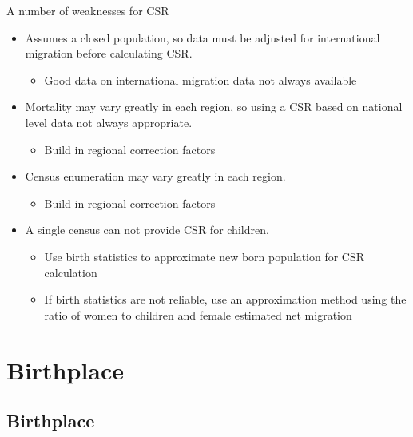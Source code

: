 \documentclass[
]{book}
\providecommand{\tightlist}{%
  \setlength{\itemsep}{0pt}\setlength{\parskip}{0pt}}
\begin{document}
A number of weaknesses for CSR

\begin{itemize}
\tightlist
\item
  Assumes a closed population, so data must be adjusted for international migration before calculating CSR.

  \begin{itemize}
  \tightlist
  \item
    Good data on international migration data not always available
  \end{itemize}
\item
  Mortality may vary greatly in each region, so using a CSR based on national level data not always appropriate.

  \begin{itemize}
  \tightlist
  \item
    Build in regional correction factors
  \end{itemize}
\item
  Census enumeration may vary greatly in each region.

  \begin{itemize}
  \tightlist
  \item
    Build in regional correction factors
  \end{itemize}
\item
  A single census can not provide CSR for children.

  \begin{itemize}
  \tightlist
  \item
    Use birth statistics to approximate new born population for CSR calculation
  \item
    If birth statistics are not reliable, use an approximation method using the ratio of women to children and female estimated net migration
  \end{itemize}
\end{itemize}

\hypertarget{birthplace}{%
\section{Birthplace}\label{birthplace}}

\hypertarget{birthplace-1}{%
\subsection{Birthplace}\label{birthplace-1}}
\end{document}

